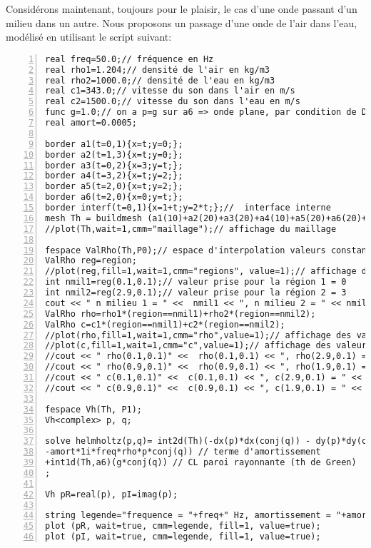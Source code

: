 Considérons maintenant, toujours pour le plaisir, le cas d'une onde passant d'un milieu dans un autre. Nous proposons un passage d'une onde de l'air dans l'eau, modélisé en utilisant le script \freefem suivant:
\scriptsize
\begin{Verbatim}[numbers=left,numbersep=3pt,firstnumber=1]
real freq=50.0;// fréquence en Hz
real rho1=1.204;// densité de l'air en kg/m3
real rho2=1000.0;// densité de l'eau en kg/m3
real c1=343.0;// vitesse du son dans l'air en m/s
real c2=1500.0;// vitesse du son dans l'eau en m/s
func g=1.0;// on a p=g sur a6 => onde plane, par condition de Dirichlet
real amort=0.0005;

border a1(t=0,1){x=t;y=0;};
border a2(t=1,3){x=t;y=0;};
border a3(t=0,2){x=3;y=t;};
border a4(t=3,2){x=t;y=2;};
border a5(t=2,0){x=t;y=2;};
border a6(t=2,0){x=0;y=t;};
border interf(t=0,1){x=1+t;y=2*t;};//  interface interne
mesh Th = buildmesh (a1(10)+a2(20)+a3(20)+a4(10)+a5(20)+a6(20)+interf(30));
//plot(Th,wait=1,cmm="maillage");// affichage du maillage

fespace ValRho(Th,P0);// espace d'interpolation valeurs constantes par élément
ValRho reg=region;
//plot(reg,fill=1,wait=1,cmm="regions", value=1);// affichage des régions
int nmil1=reg(0.1,0.1);// valeur prise pour la région 1 = 0
int nmil2=reg(2.9,0.1);// valeur prise pour la région 2 = 3
cout << " n milieu 1 = " <<  nmil1 << ", n milieu 2 = " << nmil2<< endl;
ValRho rho=rho1*(region==nmil1)+rho2*(region==nmil2);
ValRho c=c1*(region==nmil1)+c2*(region==nmil2);
//plot(rho,fill=1,wait=1,cmm="rho",value=1);// affichage des valeurs de rho
//plot(c,fill=1,wait=1,cmm="c",value=1);// affichage des valeurs de c
//cout << " rho(0.1,0.1)" <<  rho(0.1,0.1) << ", rho(2.9,0.1) = " << rho(2.9,0.1)<< endl;
//cout << " rho(0.9,0.1)" <<  rho(0.9,0.1) << ", rho(1.9,0.1) = " << rho(1.9,0.1)<< endl;
//cout << " c(0.1,0.1)" <<  c(0.1,0.1) << ", c(2.9,0.1) = " << c(2.9,0.1)<< endl;
//cout << " c(0.9,0.1)" <<  c(0.9,0.1) << ", c(1.9,0.1) = " << c(1.9,0.1)<< endl;

fespace Vh(Th, P1);
Vh<complex> p, q;

solve helmholtz(p,q)= int2d(Th)(-dx(p)*dx(conj(q)) - dy(p)*dy(conj(q)) +freq/c*freq/c*p*conj(q) // forme bilin non amortie
-amort*1i*freq*rho*p*conj(q)) // terme d'amortissement
+int1d(Th,a6)(g*conj(q)) // CL paroi rayonnante (th de Green)
;

Vh pR=real(p), pI=imag(p);

string legende="frequence = "+freq+" Hz, amortissement = "+amort*100+"%";
plot (pR, wait=true, cmm=legende, fill=1, value=true);
plot (pI, wait=true, cmm=legende, fill=1, value=true);
\end{Verbatim}
